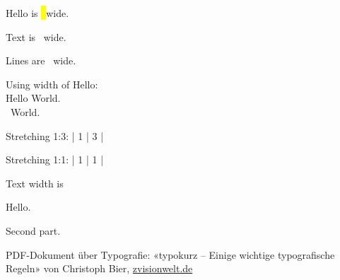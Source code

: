 \documentclass{article}
\begin{document}
\newlength{\hl}
\settowidth{\hl}{Hello}
Hello is \the\hl\ wide.

Text is \the\textwidth\ wide.

\setlength{\parskip}{\parskip+6pt}

Lines are \the\linewidth\ wide.

Using width of Hello:\\
Hello World.\\
\hspace*{\hl}\ World.

Stretching 1:3: |  1  |  3  |

Stretching 1:1: | \hfill 1 \hfill | \hfill 1 \hfill |

\newsavebox{\myBox}

\newlength{\imgW}
\settowidth{\imgW}{\usebox{\myBox}}

Text width is \the\imgW


\noindent
\setlength{\fboxsep}{0pt}

\noindent
{}

\noindent
\begin{minipage}{\textwidth}
 \parbox{.2\textwidth}{Hello.}
 \parbox{\dimexpr \textwidth-.2\textwidth}{Second part.}
\end{minipage}


\noindent
\begin{minipage}{\textwidth}
 \parbox[t]{1.2cm}{  }
 \parbox[t]{\dimexpr \textwidth-1.2cm}{PDF-Dokument über Typografie: «typokurz -- Einige wichtige typografische Regeln» von Christoph Bier, \href{http://www.zvisionwelt.de}{zvisionwelt.de} }
\end{minipage}
\end{document}
